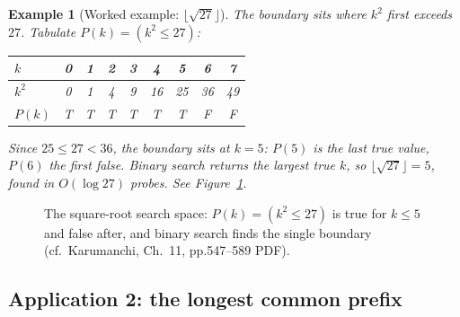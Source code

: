 \documentclass[11pt]{article}
\newtheorem{example}{Example}[section]
\begin{document}
\begin{example}[Worked example: $\lfloor \sqrt{27} \rfloor$]
The boundary sits where $k^2$ first exceeds $27$. Tabulate $P(k) = (k^2 \le 27)$:

\begin{center}
{\footnotesize
\begin{tabular}{l|cccccccc}
  \toprule
  $k$ & 0 & 1 & 2 & 3 & 4 & 5 & 6 & 7 \\
  \midrule
  $k^2$ & 0 & 1 & 4 & 9 & 16 & 25 & 36 & 49 \\
  $P(k)$ & T & T & T & T & T & T & F & F \\
  \bottomrule
\end{tabular}}
\end{center}

Since $25 \le 27 < 36$, the boundary sits at $k = 5$: $P(5)$ is the last true value, $P(6)$ the first false. Binary search returns the largest true $k$, so $\lfloor \sqrt{27} \rfloor = 5$, found in $O(\log 27)$ probes. See Figure~\ref{fig:isqrt}.
\end{example}

\begin{figure}[h]
  \centering
  \caption{The square-root search space: $P(k) = (k^2 \le 27)$ is true for $k \le 5$ and false after, and binary search finds the single boundary (cf.\ Karumanchi, Ch.~11, pp.547--589 PDF).}
  \label{fig:isqrt}
\end{figure}

\subsection{Application 2: the longest common prefix}
\end{document}
